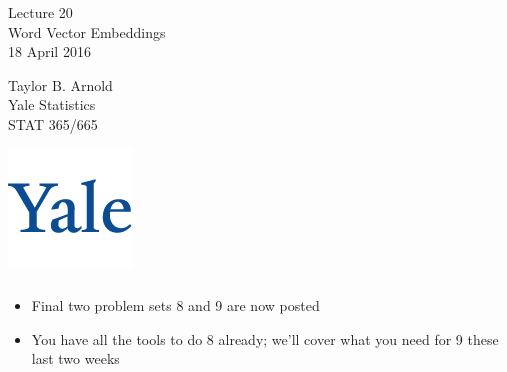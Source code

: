 \documentclass[xetex,mathserif,serif,aspectratio=169]{beamer}
\begin{document}
\begin{frame}[fragile] \frametitle{} \oldB \small

\vfill

{\fontsize{0.7cm}{0cm}\selectfont Lecture 20 \\\vspace{0.2cm}
Word Vector Embeddings}\\\vspace{0.5cm}
18 April 2016

\vspace{2cm}

\begin{minipage}{0.6\textwidth}
Taylor B. Arnold \\
Yale Statistics \\
STAT 365/665
\end{minipage}
\hfill
\begin{minipage}{0.3\textwidth}\raggedleft
\includegraphics[scale=0.3]{../yale-logo.png}
\end{minipage}%

\end{frame}

\begin{frame}[fragile] \frametitle{} \oldB \small


\begin{itemize}
\item Final two problem sets 8 and 9 are now posted
\item You have all the tools to do 8 already; we'll cover
what you need for 9 these last two weeks
\end{itemize}

\end{frame}
\end{document}
